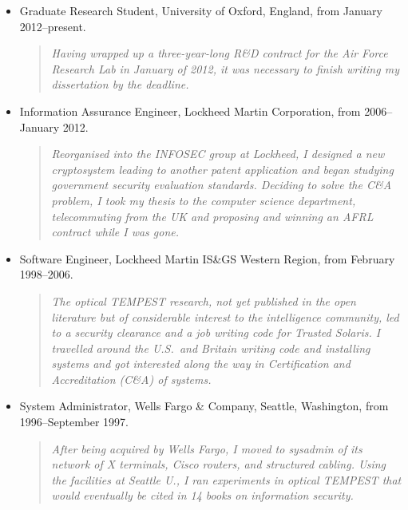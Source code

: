 \documentclass[letterpaper]{article}
\begin{document}
\begin{itemize}
	\item Graduate Research Student, University of Oxford, England, from January 2012--present.
		\begin{quote}\vspace{-2mm}
			\emph{Having wrapped up a three-year-long R\&D contract for the Air Force Research
			Lab in January of 2012, it was necessary to finish writing my dissertation by
			the deadline.}
		\end{quote}

	\item Information Assurance Engineer, Lockheed Martin Corporation, from 2006--January 2012.
		\begin{quote}\vspace{-2mm}
			\emph{Reorganised into the INFOSEC group at Lockheed, I designed a new
			cryptosystem leading to another patent application and began studying
			government security evaluation standards.  Deciding to solve the C\&A problem,
			I took my thesis to the computer science department, telecommuting from the UK and
			proposing and winning an AFRL contract while I was gone.}
		\end{quote}

	\item Software Engineer, Lockheed Martin IS\&GS Western Region, from February 1998--2006.
		\begin{quote}\vspace{-2mm}
			\emph{The optical TEMPEST research, not yet published in the open literature but of
			considerable interest to the intelligence community, led to a security clearance and
			a job writing code for Trusted Solaris.  I travelled around the U.S.\ and Britain
			writing code and installing systems and got interested along the way in
			Certification and Accreditation (C\&A) of systems.}
		\end{quote}

	\item System Administrator, Wells Fargo \& Company, Seattle, Washington,
		from 1996--September 1997.
		\begin{quote}\vspace{-2mm}
			\emph{After being acquired by Wells Fargo, I moved to sysadmin of its network
			of X terminals, Cisco routers, and structured cabling.  Using the facilities
			at Seattle U., I ran experiments in optical TEMPEST that would eventually
			be cited in 14 books on information security.}
		\end{quote}


\end{itemize}
\end{document}
